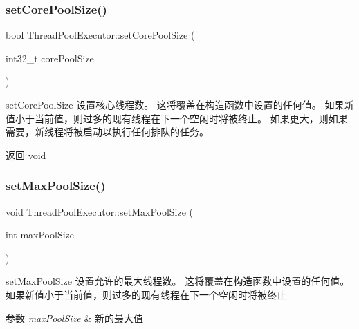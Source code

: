 \subsubsection{\texorpdfstring{set\+Core\+Pool\+Size()}{setCorePoolSize()}}
{\footnotesize\ttfamily bool Thread\+Pool\+Executor\+::set\+Core\+Pool\+Size (\begin{DoxyParamCaption}\item[{int32\+\_\+t}]{core\+Pool\+Size }\end{DoxyParamCaption})}



set\+Core\+Pool\+Size 设置核心线程数。 这将覆盖在构造函数中设置的任何值。 如果新值小于当前值，则过多的现有线程在下一个空闲时将被终止。 如果更大，则如果需要，新线程将被启动以执行任何排队的任务。 

\begin{DoxyReturn}{返回}
void 
\end{DoxyReturn}
\mbox{\label{classThreadPoolExecutor_a83e9e3715fdacc5b2f08b563d39bb62b}} 
\subsubsection{\texorpdfstring{set\+Max\+Pool\+Size()}{setMaxPoolSize()}}
{\footnotesize\ttfamily void Thread\+Pool\+Executor\+::set\+Max\+Pool\+Size (\begin{DoxyParamCaption}\item[{int}]{max\+Pool\+Size }\end{DoxyParamCaption})}



set\+Max\+Pool\+Size 设置允许的最大线程数。 这将覆盖在构造函数中设置的任何值。 如果新值小于当前值，则过多的现有线程在下一个空闲时将被终止 


\begin{DoxyParams}{参数}
{\em max\+Pool\+Size} & 新的最大值 \\
\hline
\end{DoxyParams}
\mbox{\label{classThreadPoolExecutor_a0e8838b0dcb195c2b4693bdab1eacf39}} 
